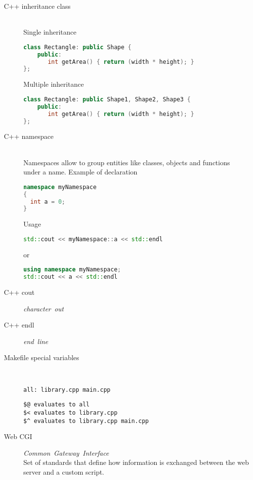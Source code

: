 \documentclass{article}
\begin{document}
\begin{description}
    \item[C++ inheritance class] \mbox{}\\ Single inheritance
\begin{lstlisting}[language=C++]
class Rectangle: public Shape {
    public:
       int getArea() { return (width * height); }
};
\end{lstlisting}
    Multiple inheritance
\begin{lstlisting}[language=C++]
class Rectangle: public Shape1, Shape2, Shape3 {
    public:
       int getArea() { return (width * height); }
};
\end{lstlisting}
    \item[C++ namespace] \mbox{}\\ Namespaces allow to group entities like classes, objects and functions under a name. Example of declaration
\begin{lstlisting}[language=C++]
namespace myNamespace
{
  int a = 0;
}
\end{lstlisting}

    Usage

\begin{lstlisting}[language=C++]
std::cout << myNamespace::a << std::endl
\end{lstlisting}
    or
\begin{lstlisting}[language=C++]
using namespace myNamespace;
std::cout << a << std::endl
\end{lstlisting}

    \item[C++ cout] \mbox{\textit{character out}}\\
    \item[C++ endl] \mbox{\textit{end line}}\\ 
    \item[Makefile special variables] \mbox{}\\
      
\begin{lstlisting}
all: library.cpp main.cpp
\end{lstlisting}

\begin{lstlisting}
$@ evaluates to all
$< evaluates to library.cpp
$^ evaluates to library.cpp main.cpp
\end{lstlisting}

    \item[Web CGI] \mbox{\textit{Common Gateway Interface}}\\
    Set of standards that define how information is exchanged between the web server and a custom script.


\end{description}
\end{document}
